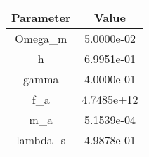 \begin{table}
\centering
\begin{tabular}{cc}
Parameter & Value \\ 
\hline
Omega_m & 5.0000e-02 \\ 
h & 6.9951e-01 \\ 
gamma & 4.0000e-01 \\ 
f_a & 4.7485e+12 \\ 
m_a & 5.1539e-04 \\ 
lambda_s & 4.9878e-01 \\ 
\end{tabular}
\end{table}
